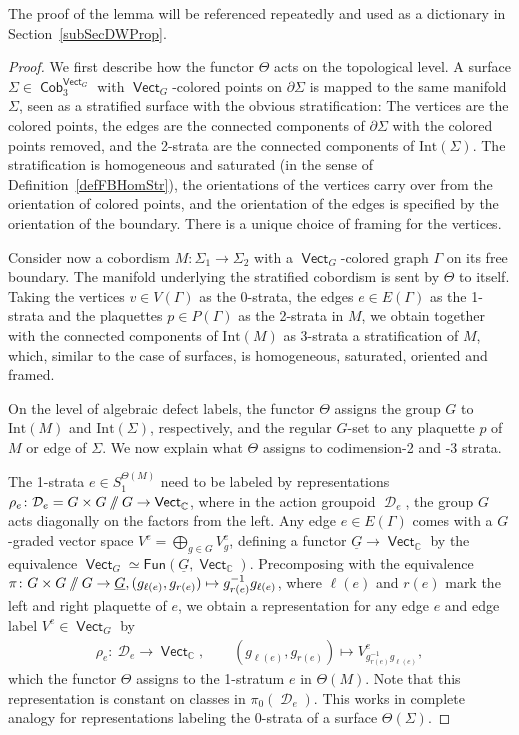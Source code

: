 \documentclass[10pt,a4paper]{amsart}
\DeclareMathOperator{\vect}{\mathsf{Vect}}
\DeclareMathOperator{\C}{\mathbb{C}}
\DeclareMathOperator{\Cob}{\mathsf{Cob}}
\DeclareMathOperator{\cald}{\mathcal{D}}
\newcommand{\sslash}{\mathbin{/\mkern-6mu/}}
\numberwithin{equation}{section}
\theoremstyle{definition}
\begin{document}
The proof of the lemma will be referenced repeatedly and used as a dictionary in Section~\ref{subSecDWProp}.
\begin{proof}
 We first describe how the functor $\Theta$ acts on the topological level. A surface $\Sigma \in \Cob_3^{\vect_G}$ with $\vect_G$-colored points on $\partial \Sigma$ is mapped to the same manifold $\Sigma$, seen as a stratified surface with the obvious stratification: The vertices are the colored points, the edges are the connected components of $\partial \Sigma$ with the colored points removed, and the 2-strata are the connected components of $\mathrm{Int}(\Sigma)$. The stratification is homogeneous and saturated (in the sense of Definition~\ref{defFBHomStr}), the orientations of the vertices carry over from the orientation of colored points, and the orientation of the edges is specified by the orientation of the boundary. There is a unique choice of framing for the vertices.

 Consider now a cobordism $M\colon \Sigma_1 \rightarrow \Sigma_2$ with a $\vect_G$-colored graph $\Gamma$ on its free boundary. The manifold underlying the stratified cobordism is sent by $\Theta$ to itself. Taking the vertices $v \in V(\Gamma)$ as the 0-strata, the edges $e \in E(\Gamma)$ as the 1-strata and the plaquettes $p \in P(\Gamma)$ as the 2-strata in $M$, we obtain together with the connected components of $\mathrm{Int}(M)$ as 3-strata a stratification of $M$, which, similar to the case of surfaces, is homogeneous, saturated, oriented and framed.

 On the level of algebraic defect labels, the functor $\Theta$ assigns the group $G$ to $\mathrm{Int}(M)$ and $\mathrm{Int}(\Sigma)$, respectively, and the regular $G$-set to any plaquette $p$ of $M$ or edge of $\Sigma$. We now explain what $\Theta$ assigns to codimension-2 and -3 strata.

 The 1-strata $e \in S_1^{\Theta(M)}$ need to be labeled by representations $\rho_e\colon \mathcal{D}_e = G \times G \sslash G \rightarrow \vect_{\C}$, where in the action groupoid $\cald_e$, the group $G$ acts diagonally on the factors from the left. Any edge $e \in E(\Gamma)$ comes with a $G$-graded vector space $V^e = \bigoplus_{g \in G}V_g^e$, defining a functor $\underline{G} \rightarrow \vect_{\C}$ by the equivalence $\vect_G \simeq \mathsf{Fun}\left(\underline{G}, \vect_{\C}\right)$. Precomposing with the equivalence $\pi\colon G \times G \sslash G \rightarrow \underline{G}, (g_{\ell(e)}, g_{r(e)}) \mapsto g_{r(e)}^{-1}g_{\ell(e)}$, where $\ell(e)$ and $r(e)$ mark the left and right plaquette of $e$, we obtain a representation for any edge $e$ and edge label $V^e \in \vect_G$ by
 \begin{align*}
 \rho_e\colon \ \mathcal{D}_e \rightarrow \vect_{\C}, \qquad (g_{\ell(e)}, g_{r(e)}) \mapsto V_{g_{r(e)}^{-1}g_{\ell(e)}}^e,
 \end{align*}
 which the functor $\Theta$ assigns to the 1-stratum $e$ in $\Theta(M)$. Note that this representation is constant on classes in $\pi_0(\cald_e)$. This works in complete analogy for representations labeling the 0-strata of a surface $\Theta(\Sigma)$.


\end{proof}
\end{document}

